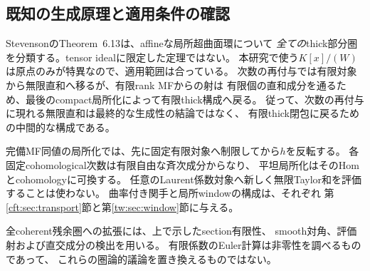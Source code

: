 \subsection{既知の生成原理と適用条件の確認}

StevensonのTheorem~6.13\cite{CRSStevenson}は、affineな局所超曲面環について
\emph{全ての}thick部分圏を分類する。tensor idealに限定した定理ではない。
本研究で使う$K[x]/(W)$は原点のみが特異なので、適用範囲は合っている。
次数の再付与では有限対象から無限直和へ移るが、有限rank MFからの射は
有限個の直和成分を通るため、最後のcompact局所化によって有限thick構成へ戻る。
従って、次数の再付与に現れる無限直和は最終的な生成性の結論ではなく、
有限thick閉包に戻るための中間的な構成である。

完備MF同値の局所化では、先に固定有限対象へ制限してから$h$を反転する。
各固定cohomological次数は有限自由な斉次成分からなり、
平坦局所化はそのHomとcohomologyに可換する。
任意のLaurent係数対象へ新しく無限Taylor和を評価することは使わない。
曲率付き関手と局所windowの構成は、それぞれ
第\ref{cft:sec:transport}節と第\ref{tw:sec:window}節に与える。

全coherent残余圏への拡張には、上で示したsection有限性、
smooth対角、評価射および直交成分の検出を用いる。
有限係数のEuler計算は非零性を調べるものであって、
これらの圏論的議論を置き換えるものではない。
